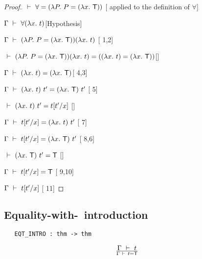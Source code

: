 \vspace{12pt plus2pt minus1pt}

\begin{proof}
\item $\ \vdash\  \forall = (\lambda P.\ P = (\lambda x.\ {\sf T}))$ \hfill
[ applied to the definition of $\forall$]
\item $\Gamma\ \vdash\  \forall(\lambda x.\ t)$\hfill [Hypothesis]
\item $\Gamma\ \vdash\  (\lambda P.\ P=(\lambda x.\ {\sf T}))(\lambda x.\ t)$\hfill
[ 1,2]
\item $\ \vdash\   (\lambda P.\ P=(\lambda x.\ {\sf T}))(\lambda x.\ t) =
((\lambda x.\ t)=(\lambda x.\ {\sf T}))$\hfill []
\item $\Gamma\ \vdash\  (\lambda x.\ t)=(\lambda x.\ {\sf T})$\hfill [ 4,3]
\item $\Gamma\ \vdash\  (\lambda x.\ t)\ t' = (\lambda x.\ {\sf T})\ t'$ \hfill
[ 5]
\item $\ \vdash\  (\lambda x.\ t)\ t' = t[t'/x]$ \hfill []
\item $\Gamma\turn t[t'/x] = (\lquant{x}t)\ t'$ \hfill [ 7]
\item $\Gamma\turn t[t'/x] = (\lquant{x}\T)\ t'$ \hfill [ 8,6]
\item $\ \vdash\  (\lambda x.\ {\sf T})\ t' = {\sf T}$ \hfill []
\item $\Gamma\ \vdash\  t[t'/x] = {\sf T}$ \hfill [ 9,10]
\item $\Gamma\ \vdash\  t[t'/x]$ \hfill [ 11]
\end{proof}




\subsection{Equality-with-\T\ introduction}

\begin{holboxed}
\begin{verbatim}
   EQT_INTRO : thm -> thm
\end{verbatim}
\end{holboxed}


\vspace{12pt plus2pt minus1pt}

$$\Gamma\ \vdash\  t\over\Gamma\ \vdash\  t={\sf T}$$

\vspace{12pt plus2pt minus1pt}

